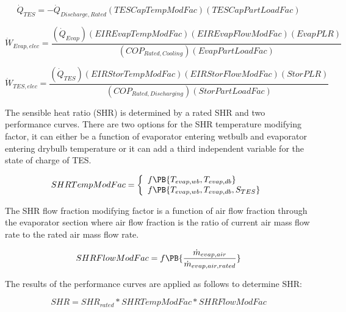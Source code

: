 \begin{equation}
{\dot Q_{TES}} =  - {\dot Q_{Discharge,Rated}}\left( {TESCapTempModFac} \right)\left( {TESCapPartLoadFac} \right)
\end{equation}

\begin{equation}
{\dot W_{Evap,elec}} = \frac{{\left( {{{\dot Q}_{Evap}}} \right)\left( {EIREvapTempModFac} \right)\left( {EIREvapFlowModFac} \right)\left( {EvapPLR} \right)}}{{\left( {CO{P_{Rated,Cooling}}} \right)\left( {EvapPartLoadFac} \right)}}
\end{equation}

\begin{equation}
{\dot W_{TES,elec}} = \frac{{\left( {{{\dot Q}_{TES}}} \right)\left( {EIRStorTempModFac} \right)\left( {EIRStorFlowModFac} \right)\left( {StorPLR} \right)}}{{\left( {CO{P_{Rated,Discharging}}} \right)\left( {StorPartLoadFac} \right)}}
\end{equation}

The sensible heat ratio (SHR) is determined by a rated SHR and two performance curves. There are two options for the SHR temperature modifying factor, it can either be a function of evaporator entering wetbulb and evaporator entering drybulb temperature or it can add a third independent variable for the state of charge of TES.

\begin{equation}
  SHRTempModFac = \left\{
    \begin{array}{l}
      f\PB{T_{evap,wb},T_{evap,db}} \\
      f\PB{T_{evap,wb},T_{evap,db},S_{TES}}
    \end{array}
  \right.
\end{equation}

The SHR flow fraction modifying factor is a function of air flow fraction through the evaporator section where air flow fraction is the ratio of current air mass flow rate to the rated air mass flow rate.

\begin{equation}
SHRFlowModFac = f\PB{\frac{\dot{m}_{evap,air}}{\dot{m}_{evap,air,rated}}}
\end{equation}

The results of the performance curves are applied as follows to determine SHR:

\begin{equation}
SHR = SH{R_{rated}}*SHRTempModFac*SHRFlowModFac
\end{equation}

